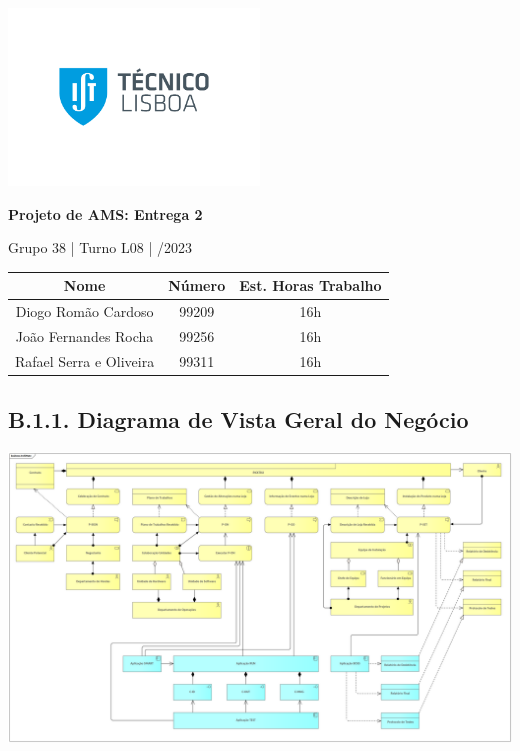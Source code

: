 \documentclass[12pt,a4paper]{article}
\begin{document}
\begin{titlepage}
	\begin{center}

		\vspace*{0.5cm}
		\includegraphics[width=0.5\textwidth]{ist-logo.png}

		\vspace{1cm}
		\Huge
		\textbf{Projeto de AMS: Entrega 2}

		\vspace{0.5cm}
		\LARGE
		Grupo 38 \quad | \quad Turno L08 \quad | /2023

		\vfill
	\end{center}

	\large
	\begin{tabular}{c|c|c}
		\textbf{Nome}           & \textbf{Número} & \textbf{Est. Horas Trabalho} \\
		\hline
		Diogo Romão Cardoso     & 99209           & 16h                          \\
		João Fernandes Rocha    & 99256           & 16h                          \\
		Rafael Serra e Oliveira & 99311           & 16h
	\end{tabular}

	\vspace{5cm}
\end{titlepage}

\begin{landscape}
	\section*{B.1.1. Diagrama de Vista Geral do Negócio}
	\includegraphics[width=1.59\textwidth]{../ArchiMate.png}
\end{landscape}
\end{document}
